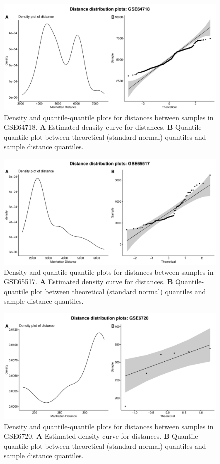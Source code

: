 \documentclass[10pt,letterpaper]{article}\usepackage[]{graphicx}\usepackage[]{color}
\begin{document}
\begin{figure}[H]
	\includegraphics[width=\textwidth]{manhattan-distance_hist_GSE64718.pdf}
	\caption{Density and quantile-quantile plots for distances between samples in GSE64718. \textbf{A} Estimated density curve for distances. \textbf{B} Quantile-quantile plot between theoretical (standard normal) quantiles and sample distance quantiles.}
\end{figure}

\begin{figure}[H]
	\includegraphics[width=\textwidth]{manhattan-distance_hist_GSE65517.pdf}
	\caption{Density and quantile-quantile plots for distances between samples in GSE65517. \textbf{A} Estimated density curve for distances. \textbf{B} Quantile-quantile plot between theoretical (standard normal) quantiles and sample distance quantiles.}
\end{figure}

\begin{figure}[H]
	\includegraphics[width=\textwidth]{manhattan-distance_hist_GSE6720.pdf}
	\caption{Density and quantile-quantile plots for distances between samples in GSE6720. \textbf{A} Estimated density curve for distances. \textbf{B} Quantile-quantile plot between theoretical (standard normal) quantiles and sample distance quantiles.}
\end{figure}
\end{document}
